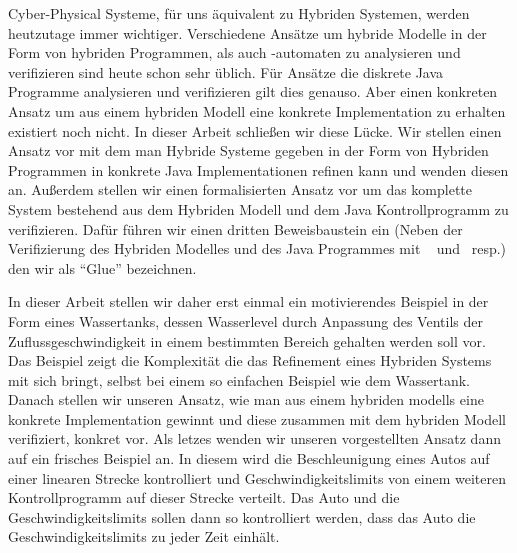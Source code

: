 
\Abstract
Cyber-Physical Systeme, für uns äquivalent zu Hybriden Systemen, werden heutzutage immer wichtiger. Verschiedene Ansätze um hybride Modelle in der Form von hybriden Programmen, als auch -automaten zu analysieren und verifizieren sind heute schon sehr üblich. Für Ansätze die diskrete Java Programme analysieren und verifizieren gilt dies genauso. Aber einen konkreten Ansatz um aus einem hybriden Modell eine konkrete Implementation zu erhalten existiert noch nicht. In dieser Arbeit schließen wir diese Lücke. Wir stellen einen Ansatz vor mit dem man Hybride Systeme gegeben in der Form von Hybriden Programmen in konkrete Java Implementationen refinen kann und wenden diesen an. Außerdem stellen wir einen formalisierten Ansatz vor um das komplette System bestehend aus dem Hybriden Modell und dem Java Kontrollprogramm zu verifizieren. Dafür führen wir einen dritten Beweisbaustein ein (Neben der Verifizierung des Hybriden Modelles und des Java Programmes mit \keym~ und \key~resp.) den wir als  ``Glue'' bezeichnen.

In dieser Arbeit stellen wir daher erst einmal ein motivierendes Beispiel in der Form eines Wassertanks, dessen Wasserlevel durch Anpassung des Ventils der Zuflussgeschwindigkeit in einem bestimmten Bereich gehalten werden soll vor. Das Beispiel zeigt die Komplexität die das Refinement eines Hybriden Systems mit sich bringt, selbst bei einem so einfachen Beispiel wie dem Wassertank. Danach stellen wir unseren Ansatz, wie man aus einem hybriden modells eine konkrete Implementation gewinnt und diese zusammen mit dem hybriden Modell verifiziert, konkret vor. Als letzes wenden wir unseren vorgestellten Ansatz dann auf ein frisches Beispiel an. In diesem wird die Beschleunigung eines Autos auf einer linearen Strecke kontrolliert und Geschwindigkeitslimits von einem weiteren Kontrollprogramm auf dieser Strecke verteilt. Das Auto und die Geschwindigkeitslimits sollen dann so kontrolliert werden, dass das Auto die Geschwindigkeitslimits zu jeder Zeit einhält.
